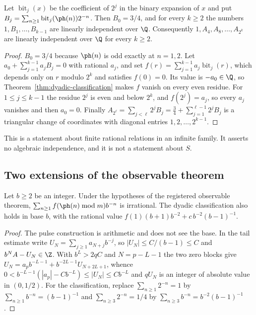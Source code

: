 \begin{cor}
\label{cor:joint-independence}
Let $\operatorname{bit}_j(x)$ be the coefficient of $2^j$ in the binary expansion of $x$ and
put $B_j=\sum_{n\ge1}\operatorname{bit}_j(\ph(n))2^{-n}$. Then $B_0=3/4$, and for every
$k\ge2$ the numbers $1,B_1,\ldots,B_{k-1}$ are linearly independent over
$\Q$. Consequently $1,A_4,A_8,\ldots,A_{2^k}$ are linearly independent over
$\Q$ for every $k\ge2$. 
\end{cor}

\begin{proof}
$B_0=3/4$ because $\ph(n)$ is odd exactly at $n=1,2$. Let
$a_0+\sum_{j=1}^{k-1}a_jB_j=0$ with rational $a_j$, and set
$f(r)=\sum_{j=1}^{k-1}a_j\operatorname{bit}_j(r)$, which depends only on $r$ modulo $2^k$
and satisfies $f(0)=0$. Its value is $-a_0\in\Q$, so
Theorem~\ref{thm:dyadic-classification} makes $f$ vanish on every even
residue. For $1\le j\le k-1$ the residue $2^j$ is even and below $2^k$, and
$f(2^j)=a_j$, so every $a_j$ vanishes and then $a_0=0$. Finally
$A_{2^\ell}=\sum_{j<\ell}2^jB_j=\frac34+\sum_{j=1}^{\ell-1}2^jB_j$ is a
triangular change of coordinates with diagonal entries $1,2,\ldots,2^{k-1}$.
\end{proof}

This is a statement about finite rational relations in an infinite family. It
asserts no algebraic independence, and it is not a statement about $S$.

\subsection{Two extensions of the observable theorem}

\begin{prop}\label{prop:allbase-observable}
Let $b\ge2$ be an integer. Under the hypotheses of the registered observable
theorem, $\sum_{n\ge1}f(\ph(n)\bmod m)b^{-n}$ is irrational. The dyadic
classification also holds in base $b$, with the rational value
$f(1)(b+1)b^{-2}+c\,b^{-2}(b-1)^{-1}$. 
\end{prop}

\begin{proof}
The pulse construction is arithmetic and does not see the base. In the tail
estimate write $U_N=\sum_{j\ge1}a_{N+j}b^{-j}$, so $|U_N|\le C/(b-1)\le C$ and
$b^NA-U_N\in\Z$. With $b^L>2qC$ and $N=p-L-1$ the two zero blocks give
$U_N=a_pb^{-L-1}+b^{-2L-1}U_{N+2L+1}$, whence
$0<b^{-L-1}(|a_p|-Cb^{-L})\le|U_N|\le Cb^{-L}$ and $qU_N$ is an integer of
absolute value in $(0,1/2)$. For the classification, replace
$\sum_{n\ge1}2^{-n}=1$ by $\sum_{n\ge1}b^{-n}=(b-1)^{-1}$ and
$\sum_{n\ge3}2^{-n}=1/4$ by $\sum_{n\ge3}b^{-n}=b^{-2}(b-1)^{-1}$.
\end{proof}

